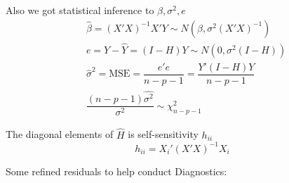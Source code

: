     Also we got statistical inference to $ \beta ,\sigma ^2, e $
    \begin{align}
        &\hat{\beta }=(X'X)^{-1}X'Y\sim N(\beta ,\sigma ^2(X'X)^{-1})\\
        &e=Y-\hat{Y}=(I-H)Y \sim N(0,\sigma ^2(I-H))\\
        &\hat{\sigma }^2=\mathrm{MSE}=\dfrac{e'e}{n-p-1}=\dfrac{Y'(I-H)Y}{n-p-1}\\
        &\dfrac{(n-p-1)\hat{\sigma ^2}}{\sigma ^2}\sim  \chi^2_{n-p-1} 
    \end{align}
 
    The diagonal elements  of $ \hat{H} $ is self-sensitivity $ h_{ii} $
    \[
        h_{ii}=X_i'(X'X)^{-1}X_i
    \]
    
    



\begin{point}
    Some refined residuals to help conduct Diagnostics:
\end{point}
    
